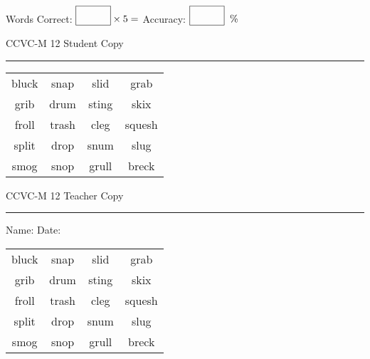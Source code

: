 \documentclass{memoir}
\begin{document}
\small

Words Correct: $\fbox{\phantom{\huge 100}} \times 5 = $ Accuracy: $\fbox{\phantom{\huge 100}}\;\; \%$ 

\vfill

\newpage


\footnotesize \noindent
CCVC-M 12 \hfill Student Copy
\smallskip
\hrule

\Large

\setlength{\tabcolsep}{14pt}
\def\arraystretch{3}

{\selectfont


\begin{vplace}[0.5]
\begin{center}
\begin{tabular}{cccc}
bluck            & snap & slid & grab                    \\
grib     & drum & sting & skix \\
froll & trash & cleg & squesh \\
split & drop & snum & slug \\
smog & snop & grull            & breck       \\
\end{tabular}
\end{center}
\end{vplace}

}

\newpage

\footnotesize \noindent
CCVC-M 12 \hfill Teacher Copy
\smallskip
\hrule

\small

\vfill

\noindent
Name: \underline{\hspace{1.75in}} \hfill Date: \underline{\hspace{1in}}

\Large

{\selectfont


\begin{vplace}[0.5]
\begin{center}
\begin{tabular}{cccc}
bluck            & snap & slid & grab                    \\
grib     & drum & sting & skix \\
froll & trash & cleg & squesh \\
split & drop & snum & slug \\
smog & snop & grull            & breck       \\
\end{tabular}
\end{center}
\end{vplace}



}
\end{document}
